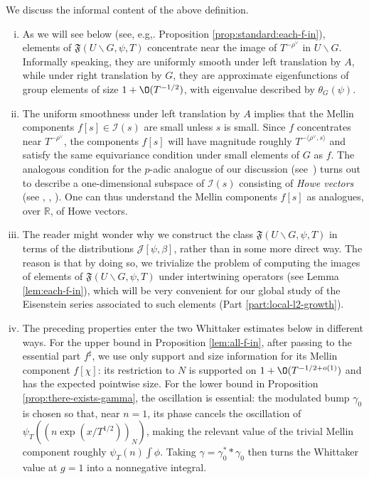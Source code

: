 \begin{remark}\label{rmk:we-discuss-informal-cal-F-U-G-T}
  We discuss the informal content of the above definition.
  \begin{enumerate}[(i)]
  \item
    As we will see below (see, e.g,. Proposition \ref{prop:standard:each-f-in}), elements of $\mathfrak{F}(U \backslash G, \psi, T)$ concentrate near the image of $T^{-\rho^\vee}$ in $U \backslash G$.  Informally speaking, they are uniformly smooth under left translation by $A$, while under right translation by $G$, they are approximate eigenfunctions of group elements of size $1 + \O(T^{-1/2})$, with eigenvalue described by $\theta_G(\psi)$.
  \item The uniform smoothness under left translation by $A$ implies that the Mellin components $f[s] \in \mathcal{I}(s)$ are small unless $s$ is small.  Since $f$ concentrates near $T^{-\rho^\vee}$, the components $f[s]$ will have magnitude roughly $T^{- \langle \rho^\vee, s \rangle}$ and satisfy the same equivariance condition under small elements of $G$ as $f$.  The analogous condition for the $p$-adic analogue of our discussion (see~\cite{2025arXiv2503.12310}) turns out to describe a one-dimensional subspace of $\mathcal{I}(s)$ consisting of \emph{Howe vectors} (see \cite[\S5]{MR2016587}, \cite[\S7.1]{MR2192818}, \cite[\S5]{MR3683106}).  One can thus understand the Mellin components $f[s]$ as analogues, over $\mathbb{R}$, of Howe vectors.
  \item The reader might wonder why we construct the class $\mathfrak{F}(U \backslash G, \psi, T)$ in terms of the distributions $\mathcal{J}[\psi,\beta]$, rather than in some more direct way.  The reason is that by doing so, we trivialize the problem of computing the images of elements of $\mathfrak{F}(U \backslash G, \psi, T)$ under intertwining operators (see Lemma \ref{lem:each-f-in}), which will be very convenient for our global study of the Eisenstein series associated to such elements (Part \ref{part:local-l2-growth}).
  \item
    The preceding properties enter the two Whittaker estimates below in different ways.  For the upper bound in Proposition \ref{lem:all-f-in}, after passing to the essential part \(f^\sharp\), we use only support and size information for its Mellin component \(f[\chi]\): its restriction to \(N\) is supported on \(1+\O(T^{-1/2+o(1)})\) and has the expected pointwise size.  For the lower bound in Proposition \ref{prop:there-exists-gamma}, the oscillation is essential: the modulated bump \(\gamma_0\) is chosen so that, near \(n=1\), its phase cancels the oscillation of \(\psi_T((n\exp(x/T^{1/2}))_N)\), making the relevant value of the trivial Mellin component roughly \(\psi_T(n)\int \phi\).  Taking \(\gamma=\gamma_0^*\ast\gamma_0\) then turns the Whittaker value at \(g=1\) into a nonnegative integral.

\end{enumerate}
\end{remark}
